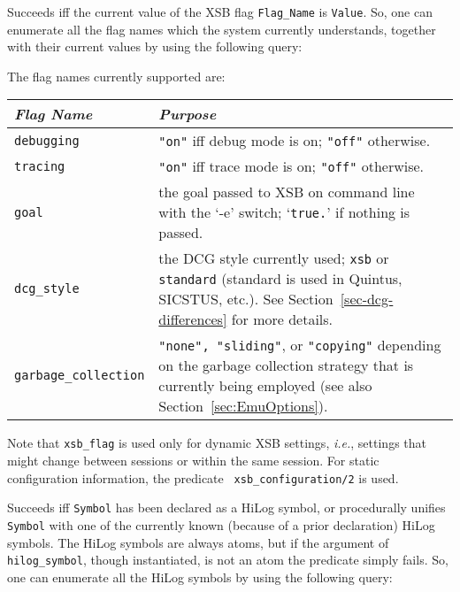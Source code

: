 \begin{description}
    Succeeds iff the current value of the XSB flag {\tt Flag\_Name} is 
    {\tt Value}. So, one can enumerate all the flag names which the system
    currently understands, together with their current values by using the
    following query:


    The flag names currently supported are:

    \begin{center}
    \begin{tabular}{||l|p{11cm}||}               \hline
	{\em Flag Name}		& {\em Purpose} \\ \hline \hline
	{\tt debugging}		& 
		{\tt "on"} iff debug mode is on; {\tt "off"} otherwise.\\
		\hline
	{\tt tracing}		& 
		{\tt "on"} iff trace mode is on; {\tt "off"} otherwise.\\
		\hline
	{\tt goal}		& 
		the goal passed to XSB on command line with the `-e'
                switch; `{\tt true.}' if nothing is passed.
                \\ \hline
        {\tt dcg\_style}        &
                the DCG style currently used; {\tt xsb} or {\tt standard}
                (standard is used in Quintus, SICSTUS, etc.).
                See Section~\ref{sec-dcg-differences} for more details.
                \\ \hline
	{\tt garbage\_collection} &
		{\tt "none", "sliding"}, or {\tt "copying"} depending
		on the garbage collection strategy that is currently
		being employed (see also Section~\ref{sec:EmuOptions}).
                \\ \hline
    \end{tabular}
    \end{center}
    
    Note that {\tt xsb\_flag} is used only for dynamic XSB settings, {\it
      i.e.}, settings that might change between sessions or within the same
    session. For static configuration information, the predicate {\tt
      xsb\_configuration/2} is used.  

    Succeeds iff {\tt Symbol} has been declared as a HiLog symbol, or 
    procedurally unifies {\tt Symbol} with one of the currently known 
    (because of a prior declaration) HiLog symbols. The HiLog symbols
    are always atoms, but if the argument of {\tt hilog\_symbol},
    though instantiated, is not an atom the predicate simply fails.
    So, one can enumerate all the HiLog symbols by using the following
    query:


\end{description}
